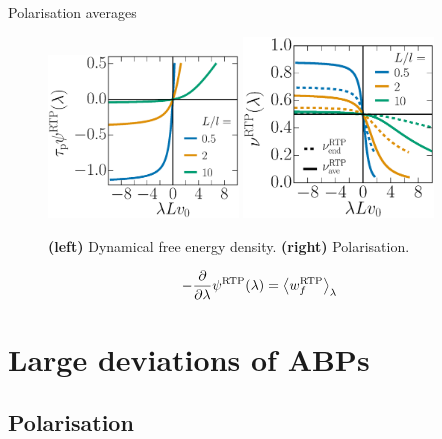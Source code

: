 \documentclass{beamer}
\begin{document}
\begin{frame}{Polarisation averages}

\begin{figure}
\centering
\includegraphics[width=0.45\textwidth]{exactPsiRTP.eps}
\includegraphics[width=0.45\textwidth]{exactNuRTP.eps}
\caption{{\bf (left)} Dynamical free energy density. {\bf (right)} Polarisation. }
\end{figure}

\begin{align*}
- \frac{\partial}{\partial \lambda} \psi^{\rm RTP}(\lambda) = \left<w^{\rm RTP}_f\right>_{\lambda}
\end{align*}

\end{frame}

\section{Large deviations of ABPs}

\subsection{Polarisation}
\end{document}
